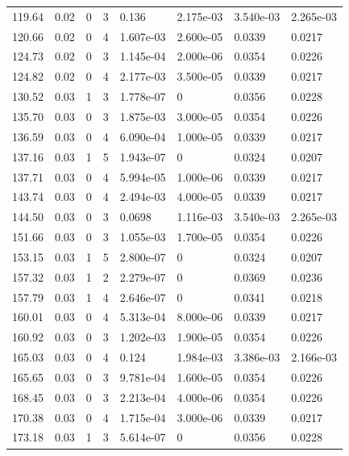 \documentclass[preview]{standalone}
\begin{document}
{{{\begin{tabular}{L{1.2cm}C{1.2cm} C{0.3cm}C{0.5cm} C{1.4cm}C{1.4cm} C{1.4cm}C{1.4cm}}
  119.64  &  0.02  & 0     &  3 &  0.136  & 2.175e-03  & 3.540e-03 &  2.265e-03   \\ 
  120.66  &  0.02  & 0     &  4 &  1.607e-03  & 2.600e-05  & 0.0339 &  0.0217   \\ 
  124.73  &  0.02  & 0     &  3 &  1.145e-04  & 2.000e-06  & 0.0354 &  0.0226   \\ 
  124.82  &  0.02  & 0     &  4 &  2.177e-03  & 3.500e-05  & 0.0339 &  0.0217   \\ 
  130.52  &  0.03  & 1     &  3 &  1.778e-07  & 0  & 0.0356 &  0.0228   \\ 
  135.70  &  0.03  & 0     &  3 &  1.875e-03  & 3.000e-05  & 0.0354 &  0.0226   \\ 
  136.59  &  0.03  & 0     &  4 &  6.090e-04  & 1.000e-05  & 0.0339 &  0.0217   \\ 
  137.16  &  0.03  & 1     &  5 &  1.943e-07  & 0  & 0.0324 &  0.0207   \\ 
  137.71  &  0.03  & 0     &  4 &  5.994e-05  & 1.000e-06  & 0.0339 &  0.0217   \\ 
  143.74  &  0.03  & 0     &  4 &  2.494e-03  & 4.000e-05  & 0.0339 &  0.0217   \\ 
  144.50  &  0.03  & 0     &  3 &  0.0698  & 1.116e-03  & 3.540e-03 &  2.265e-03   \\ 
  151.66  &  0.03  & 0     &  3 &  1.055e-03  & 1.700e-05  & 0.0354 &  0.0226   \\ 
  153.15  &  0.03  & 1     &  5 &  2.800e-07  & 0  & 0.0324 &  0.0207   \\ 
  157.32  &  0.03  & 1     &  2 &  2.279e-07  & 0  & 0.0369 &  0.0236   \\ 
  157.79  &  0.03  & 1     &  4 &  2.646e-07  & 0  & 0.0341 &  0.0218   \\ 
  160.01  &  0.03  & 0     &  4 &  5.313e-04  & 8.000e-06  & 0.0339 &  0.0217   \\ 
  160.92  &  0.03  & 0     &  3 &  1.202e-03  & 1.900e-05  & 0.0354 &  0.0226   \\ 
  165.03  &  0.03  & 0     &  4 &  0.124  & 1.984e-03  & 3.386e-03 &  2.166e-03   \\ 
  165.65  &  0.03  & 0     &  3 &  9.781e-04  & 1.600e-05  & 0.0354 &  0.0226   \\ 
  168.45  &  0.03  & 0     &  3 &  2.213e-04  & 4.000e-06  & 0.0354 &  0.0226   \\ 
  170.38  &  0.03  & 0     &  4 &  1.715e-04  & 3.000e-06  & 0.0339 &  0.0217   \\ 
  173.18  &  0.03  & 1     &  3 &  5.614e-07  & 0  & 0.0356 &  0.0228   \\ 

\end{tabular}}}}
\end{document}
